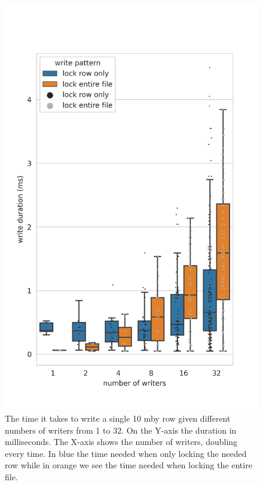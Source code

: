 %
\begin{figure}[htbp]
	\centering
	\includegraphics[height=\textheight]{../results/plots/single_vs_writers_both.png}
	\caption{The time it takes to write a single 10 \ac{mby} row given different numbers of writers from 1 to 32. On the Y-axis the duration in milliseconds. The X-axis shows the number of writers, doubling every time. In blue the time needed when only locking the needed row while in orange we see the time needed when locking the entire file.}
	\label{fig:single_writers}
\end{figure}

\clearpage
